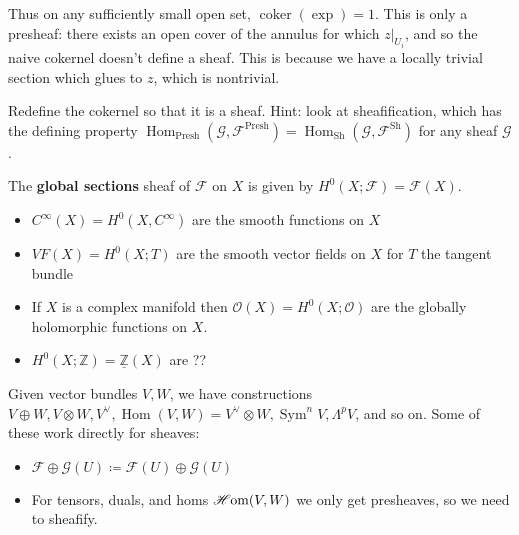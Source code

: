 Thus on any sufficiently small open set,
\(\operatorname{coker}(\exp) = 1\). This is only a presheaf: there
exists an open cover of the annulus for which
\({ \left.{{z}} \right|_{{U_i}} }\), and so the naive cokernel doesn't
define a sheaf. This is because we have a locally trivial section which
glues to \(z\), which is nontrivial.

\begin{exercise}[?]

Redefine the cokernel so that it is a sheaf. Hint: look at
sheafification, which has the defining property
\({\operatorname{Hom}}_{{\operatorname{Presh}}}(\mathcal{G}, \mathcal{F}^{\operatorname{Presh}}) ={\operatorname{Hom}}_{{\operatorname{Sh}}}( \mathcal{G}, \mathcal{F}^{{\operatorname{Sh}}})\)
for any sheaf \(\mathcal{G}\).

\end{exercise}

\begin{definition}

The \textbf{global sections} sheaf of \(\mathcal{F}\) on \(X\) is given
by \(H^0( X; \mathcal{F}) = \mathcal{F}(X)\).

\end{definition}

\begin{example}[?]

\envlist

\begin{itemize}
\tightlist
\item
  \(C^ \infty (X) = H^0(X, C^ \infty )\) are the smooth functions on
  \(X\)
\item
  \(VF(X) = H^0(X; T)\) are the smooth vector fields on \(X\) for \(T\)
  the tangent bundle
\item
  If \(X\) is a complex manifold then
  \({\mathcal{O}}(X) = H^0(X; {\mathcal{O}})\) are the globally
  holomorphic functions on \(X\).
\item
  \(H^0(X; {\mathbb{Z}}) = \underline{{\mathbb{Z}}}(X)\) are ??
\end{itemize}

\end{example}

\begin{remark}

Given vector bundles \(V, W\), we have constructions
\(V \oplus W, V \otimes W, V^\vee, {\operatorname{Hom}}(V, W) = V^\vee\otimes W, \operatorname{Sym}^n V, \Lambda^p V\),
and so on. Some of these work directly for sheaves:

\begin{itemize}
\tightlist
\item
  \(\mathcal{F} \oplus \mathcal{G}(U) \coloneqq\mathcal{F}(U) \oplus \mathcal{G}(U)\)
\item
  For tensors, duals, and homs
  \(\mathscr{H}\kern-2pt\operatorname{om}(V, W)\) we only get
  presheaves, so we need to sheafify.
\end{itemize}

\end{remark}

